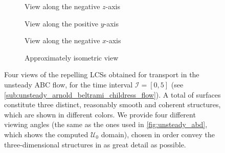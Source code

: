 \begin{figure}[htpb]
    \centering
    \hspace*{\fill}
    \begin{subfigure}[b]{0.42\textwidth}
        \centering
        \caption[]{{\small View along the negative $z$-axis}}
        \label{fig:unsteady_lcss_z}
    \end{subfigure}\hfill%
    \begin{subfigure}[b]{0.42\textwidth}
        \centering
        \caption[]{{\small View along the positive $y$-axis}}
        \label{fig:unsteady_lcss_y}
    \end{subfigure}%
    \hspace*{\fill}

    \hspace*{\fill}
    \begin{subfigure}[b]{0.42\textwidth}
        \centering
        \caption[]{{\small View along the negative $x$-axis}}
        \label{fig:unsteady_lcss_x}
    \end{subfigure}\hfill%
    \begin{subfigure}[b]{0.42\textwidth}
        \centering
        \caption[]{{\small Approximately isometric view}}
        \label{fig:unsteady_lcss_isometric}
    \end{subfigure}%
    \hspace*{\fill}
    \caption[Four views of the repelling LCSs obtained for transport in the
    unsteady ABC \newline{}flow]
    {
        Four views of the repelling LCSs obtained for transport in the unsteady
        ABC flow, for the time interval $\mathcal{I}=[0,5]$ (see
        \cref{sub:unsteady_arnold_beltrami_childress_flow}). A total of
         surfaces constitute three distinct, reasonably smooth and
        coherent structures, which are shown in different colors. We provide
        four different viewing angles (the same as the ones used in
        \cref{fig:unsteady_abd}, which shows the computed $\mathcal{U}_{0}$
        domain), chosen in order convey the three-dimensional structures in as
        great detail as possible.
}
    \label{fig:unsteady_lcss}
\end{figure}

